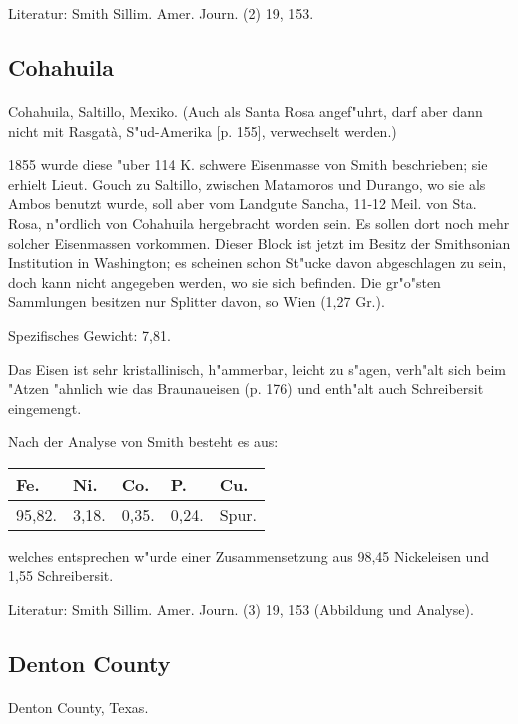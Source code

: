 \documentclass[a4paper, 11pt, oneside]{article}
\begin{document}
\footnotesize
Literatur: Smith Sillim. Amer. Journ. (2) 19, 153.

\subsection{Cohahuila}
\normalsize
\paragraph{}
Cohahuila, Saltillo, Mexiko. (Auch als Santa Rosa angef"uhrt, darf aber dann nicht mit Rasgatà, S"ud-Amerika [p. 155], verwechselt werden.)

1855 wurde diese "uber 114 K. schwere Eisenmasse von Smith beschrieben; sie erhielt Lieut. Gouch zu Saltillo, zwischen Matamoros und Durango, wo sie als Ambos benutzt wurde, soll aber vom Landgute Sancha, 11-12 Meil. von Sta. Rosa, n"ordlich von Cohahuila hergebracht worden sein. Es sollen dort noch mehr solcher Eisenmassen vorkommen. Dieser Block ist jetzt im Besitz der Smithsonian Institution in Washington; es scheinen schon St"ucke davon abgeschlagen zu sein, doch kann nicht angegeben werden, wo sie sich befinden. Die gr"o"sten Sammlungen besitzen nur Splitter davon, so Wien (1,27 Gr.).

Spezifisches Gewicht: 7,81.

Das Eisen ist sehr kristallinisch, h"ammerbar, leicht zu s"agen, verh"alt sich beim "Atzen "ahnlich wie das Braunaueisen (p. 176) und enth"alt auch Schreibersit eingemengt.

Nach der Analyse von Smith besteht es aus:
\begin{table}[H]
    \centering
    \begin{tabular}{l l l l l}
        Fe. & Ni. & Co. & P. & Cu. \\ \hline
        95,82. & 3,18. & 0,35. & 0,24. & Spur. \\
    \end{tabular}
\end{table}

welches entsprechen w"urde einer Zusammensetzung aus 98,45 Nickeleisen und 1,55 Schreibersit.

\footnotesize
Literatur: Smith Sillim. Amer. Journ. (3) 19, 153 (Abbildung und Analyse).

\subsection{Denton County}
\normalsize
\paragraph{}
Denton County, Texas.
\end{document}
